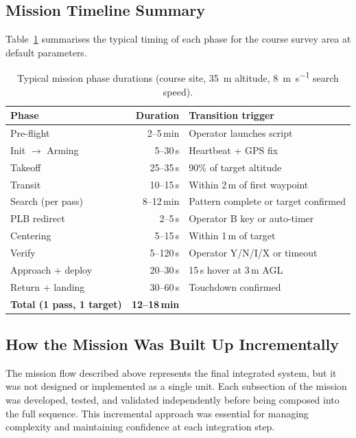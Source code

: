 \subsection{Mission Timeline Summary}\label{sec:mf-timeline}

Table~\ref{tab:mission-timeline} summarises the typical timing of each phase for the course survey area at default parameters.

\begin{table}[htbp]
\centering
\caption{Typical mission phase durations (course site, \SI{35}{\metre} altitude, \SI{8}{\metre\per\second} search speed).}
\label{tab:mission-timeline}
\begin{tabular}{@{}lrp{5.5cm}@{}}
\toprule
\textbf{Phase} & \textbf{Duration} & \textbf{Transition trigger} \\
\midrule
Pre-flight         & 2--5\,min  & Operator launches script \\
Init $\rightarrow$ Arming & 5--30\,s & Heartbeat + GPS fix \\
Takeoff            & 25--35\,s  & 90\% of target altitude \\
Transit            & 10--15\,s  & Within 2\,m of first waypoint \\
Search (per pass)  & 8--12\,min & Pattern complete or target confirmed \\
PLB redirect       & 2--5\,s    & Operator B key or auto-timer \\
Centering          & 5--15\,s   & Within 1\,m of target \\
Verify             & 5--120\,s  & Operator Y/N/I/X or timeout \\
Approach + deploy  & 20--30\,s  & 15\,s hover at 3\,m AGL \\
Return + landing   & 30--60\,s  & Touchdown confirmed \\
\midrule
\textbf{Total (1 pass, 1 target)} & \textbf{12--18\,min} & \\
\bottomrule
\end{tabular}
\end{table}

\subsection{How the Mission Was Built Up Incrementally}\label{sec:mf-buildup}

The mission flow described above represents the final integrated system, but it was not designed or implemented as a single unit.  Each subsection of the mission was developed, tested, and validated independently before being composed into the full sequence.  This incremental approach was essential for managing complexity and maintaining confidence at each integration step.

